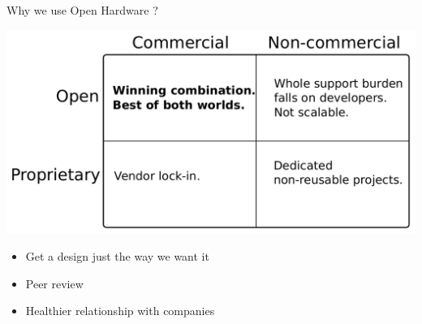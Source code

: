 \documentclass[compress,red]{beamer}
\begin{document}
\begin{frame}{Why we use Open Hardware ?}
  \begin{center}
    \includegraphics[width=.7\textwidth]{ohwr/commercial_and_open.pdf}
  \end{center}
  \begin{itemize}
    \item Get a design just the way we want it
    \item Peer review
    \item Healthier relationship with companies
  \end{itemize}
\end{frame}
\end{document}
